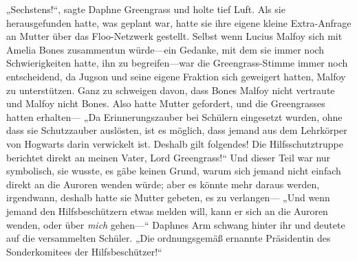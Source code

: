 „Sechstens!“, sagte Daphne Greengrass und holte tief Luft. Als sie herausgefunden hatte, was geplant war, hatte sie ihre eigene kleine Extra-Anfrage an Mutter über das Floo-Netzwerk gestellt. Selbst wenn Lucius Malfoy sich mit Amelia Bones zusammentun würde—ein Gedanke, mit dem sie immer noch Schwierigkeiten hatte, ihn zu begreifen—war die Greengrass-Stimme immer noch entscheidend, da Jugson und seine eigene Fraktion sich geweigert hatten, Malfoy zu unterstützen. Ganz zu schweigen davon, dass Bones Malfoy nicht vertraute und Malfoy nicht Bones. Also hatte Mutter gefordert, und die Greengrasses hatten erhalten—
„Da Erinnerungszauber bei Schülern eingesetzt wurden, ohne dass sie Schutzzauber auslösten, ist es möglich, dass jemand aus dem Lehrkörper von Hogwarts darin verwickelt ist. Deshalb gilt folgendes! Die Hilfsschutztruppe berichtet direkt an meinen Vater, Lord Greengrass!“
Und dieser Teil war nur symbolisch, sie wusste, es gäbe keinen Grund, warum sich jemand nicht einfach direkt an die Auroren wenden würde; aber es könnte mehr daraus werden, irgendwann, deshalb hatte sie Mutter gebeten, es zu verlangen—
„Und wenn jemand den Hilfsbeschützern etwas melden will, kann er sich an die Auroren wenden, oder über \emph{mich} gehen—“
Daphnes Arm schwang hinter ihr und deutete auf die versammelten Schüler.
„Die ordnungsgemäß ernannte Präsidentin des Sonderkomitees der Hilfsbeschützer!“

